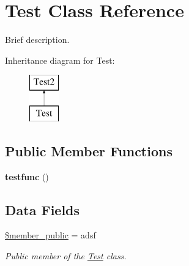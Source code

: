 \hypertarget{class_test}{}\section{Test Class Reference}
\label{class_test}


Brief description.  


Inheritance diagram for Test\+:\begin{figure}[H]
\begin{center}
\leavevmode
\includegraphics[height=2.000000cm]{class_test}
\end{center}
\end{figure}
\subsection*{Public Member Functions}
\begin{DoxyCompactItemize}
\item 
\hypertarget{class_test_a464592a38148f81120d99e66571cdcc4}{}{\bfseries testfunc} ()\label{class_test_a464592a38148f81120d99e66571cdcc4}

\end{DoxyCompactItemize}
\subsection*{Data Fields}
\begin{DoxyCompactItemize}
\item 
\hypertarget{class_test_aeb0df635d20f25c3f9de66ebc01b57e1}{}\hyperlink{class_test_aeb0df635d20f25c3f9de66ebc01b57e1}{\$member\+\_\+public} = \textquotesingle{}adsf\textquotesingle{}\label{class_test_aeb0df635d20f25c3f9de66ebc01b57e1}

\begin{DoxyCompactList}\small\item\em Public member of the \hyperlink{class_test}{Test} class. \end{DoxyCompactList}\end{DoxyCompactItemize}
